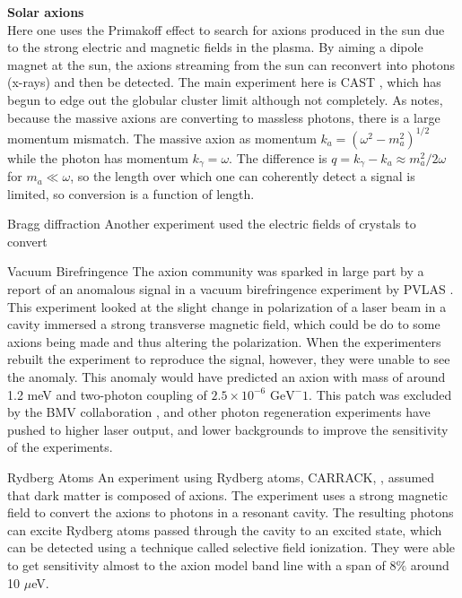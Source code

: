 \documentclass[12pt,twosides]{book}
\begin{document}
\begin{description}

\item \textbf{Solar axions} \hfill \\

Here one uses the Primakoff effect to search for axions produced in the sun due to the strong electric and magnetic fields in the plasma. By aiming a dipole magnet at the sun, the axions streaming from the sun can reconvert into photons (x-rays) and then be detected. The main experiment here is CAST \cite{cast11}, which has begun to edge out the globular cluster limit although not completely.  As \cite{raffelt08} notes, because the massive axions are converting to massless photons, there is a large momentum mismatch. The massive axion as momentum $k_a = (\omega^2 - m_a^2)^{1/2}$ while the photon has momentum $k_\gamma = \omega$. The difference is $q = k_\gamma - k_a \approx m_a^2/2\omega$ for $m_a \ll \omega$, so the length over which one can coherently detect a signal is limited, so conversion is a function of length.

\item{Bragg diffraction}
Another experiment used the electric fields of crystals to convert 

\item{Vacuum Birefringence}
The axion community was sparked in large part by a report of an anomalous signal in a vacuum birefringence experiment by PVLAS \cite{zavattinni06}. This experiment looked at the slight change in polarization of a laser beam in a cavity immersed a strong transverse magnetic field, which could be do to some axions being made and thus altering the polarization. When the experimenters rebuilt the experiment to reproduce the signal, however, they were unable to see the anomaly. This anomaly would have predicted an axion with mass of around 1.2 meV and two-photon coupling of 
$2.5\times10^{-6} \text{ GeV}^-1$. This patch was excluded by the BMV collaboration \cite{robilliard07}, and other photon regeneration experiments have pushed to higher laser output, and lower backgrounds to improve the sensitivity of the experiments.

\item{Rydberg Atoms}
An experiment using Rydberg atoms, CARRACK, \cite{yamamoto00}, assumed that dark matter is composed of axions. The experiment uses a strong magnetic field to convert the axions to photons in a resonant cavity. The resulting photons can excite Rydberg atoms passed through the cavity to an excited state, which can be detected using a technique called selective field ionization. They were able to get sensitivity almost to the axion model band line with a span of 8$\%$ around 10 $\mu$eV.


\end{description}
\end{document}

